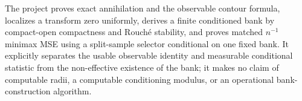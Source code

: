 The project proves exact annihilation and the observable contour formula, localizes a transform zero uniformly, derives a finite conditioned bank by compact-open compactness and Rouch\'e stability, and proves matched \(n^{-1}\) minimax MSE using a split-sample selector conditional on one fixed bank.  It explicitly separates the usable observable identity and measurable conditional statistic from the non-effective existence of the bank; it makes no claim of computable radii, a computable conditioning modulus, or an operational bank-construction algorithm.